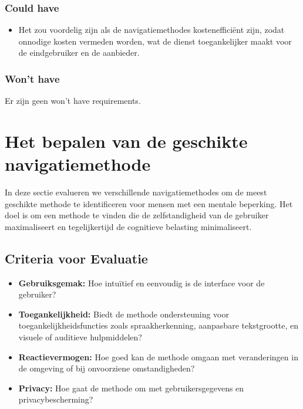 \subsubsection{Could have}
\begin{itemize}
    \item Het zou voordelig zijn als de navigatiemethodes kostenefficiënt zijn, zodat onnodige kosten vermeden worden, wat de dienst toegankelijker maakt voor de eindgebruiker en de aanbieder.
\end{itemize}

\subsubsection{Won't have}

Er zijn geen won't have requirements.

\section{Het bepalen van de geschikte navigatiemethode}
\label{sec:bepalen geschikte navigatiemethode}


In deze sectie evalueren we verschillende navigatiemethodes om de meest geschikte methode te identificeren voor mensen met een mentale beperking. Het doel is om een methode te vinden die de zelfstandigheid van de gebruiker maximaliseert en tegelijkertijd de cognitieve belasting minimaliseert.

\subsection{Criteria voor Evaluatie}
\begin{itemize}
    \item \textbf{Gebruiksgemak:} Hoe intuïtief en eenvoudig is de interface voor de gebruiker?
    \item \textbf{Toegankelijkheid:} Biedt de methode ondersteuning voor toegankelijkheidsfuncties zoals spraakherkenning, aanpasbare tekstgrootte, en visuele of auditieve hulpmiddelen?
    \item \textbf{Reactievermogen:} Hoe goed kan de methode omgaan met veranderingen in de omgeving of bij onvoorziene omstandigheden?
    \item \textbf{Privacy:} Hoe gaat de methode om met gebruikersgegevens en privacybescherming?
\end{itemize}

